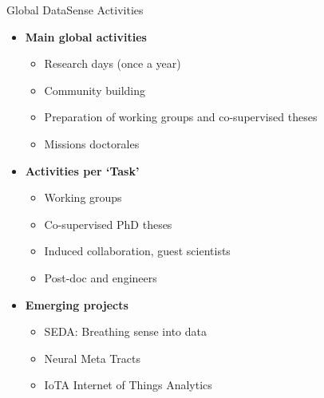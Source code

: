 \begin{frame}{Global DataSense Activities}

  \begin{itemize}
  \item \textbf{Main global activities}
    \begin{itemize}
    \item Research days (once a year)
    \item Community building
    \item Preparation of working groups and co-supervised theses
    \item Missions doctorales
    \end{itemize}

  \item \textbf{Activities per `Task'}
    \begin{itemize}
    \item Working groups
    \item Co-supervised PhD theses
    \item Induced collaboration, guest scientists
    \item Post-doc and engineers
    \end{itemize}

  \item \textbf{Emerging projects}
    \begin{itemize}
    \item SEDA: Breathing sense into data
    \item Neural Meta Tracts
    \item IoTA Internet of Things Analytics
    \end{itemize}
  \end{itemize}

\end{frame}

